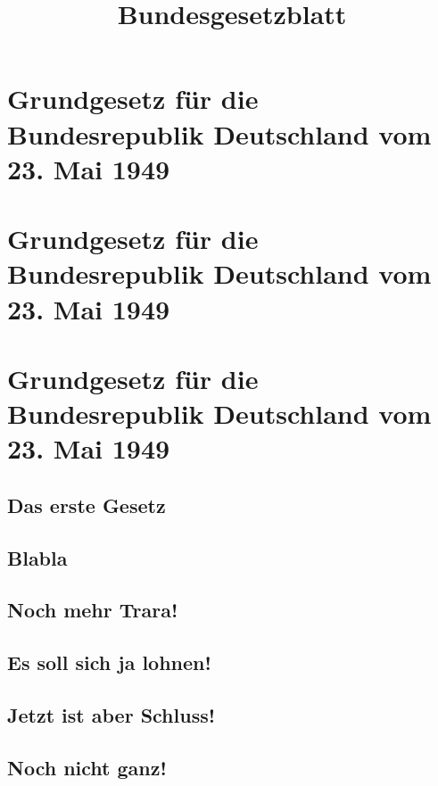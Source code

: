 \documentclass{sasbase}
\begin{document}
\title{Bundesgesetzblatt}

\mytitle

\section{Grundgesetz für die Bundesrepublik Deutschland vom 23. Mai 1949}
\section{Grundgesetz für die Bundesrepublik Deutschland vom 23. Mai 1949}
\section{Grundgesetz für die Bundesrepublik Deutschland vom 23. Mai 1949}

\lipsum[1]

\subsection{Das erste Gesetz}

\lipsum[2]

\subsection{Blabla}

\lipsum[3]

\subsection{Noch mehr Trara!}

\lipsum[4]

\subsection{Es soll sich ja lohnen!}

\lipsum[5]

\subsection{Jetzt ist aber Schluss!}

\lipsum[6]

\subsection{Noch nicht ganz!}

\lipsum[7]
\end{document}
